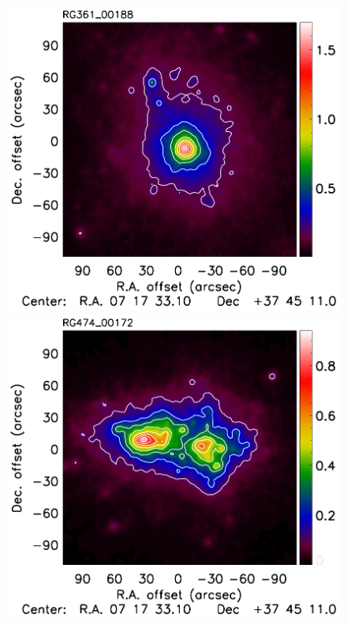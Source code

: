 \documentclass[twocolumn,traditabstract]{aa}
\begin{document}
\begin{figure}[h]
\centering
\includegraphics[trim=0cm 0.7cm 0cm 0cm, clip=true, totalheight=3.6cm]{Figure/Map_RG361_00188_DMmap_zproj_zobs0p6_raw.pdf}
\includegraphics[trim=0cm 0.7cm 0cm 0cm, clip=true, totalheight=3.6cm]{Figure/Map_RG474_00172_DMmap_zproj_zobs0p9_raw.pdf}

\end{figure}
\end{document}
